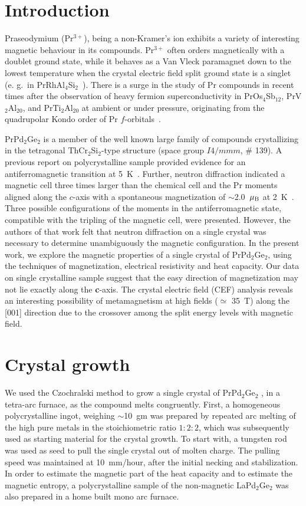 \documentclass[preprint,showpacs,preprintnumbers,amsmath,amssymb, prb]{revtex4}
\begin{document}
\section{Introduction}
Praseodymium (Pr$^{3+}$), being a non-Kramer's ion exhibits a variety of interesting magnetic behaviour in its compounds. Pr$^{3+}$ often orders magnetically with a doublet ground state, while it behaves as a Van Vleck paramagnet down to the lowest temperature when the crystal electric field split ground state is a singlet (e. g.~in PrRhAl$_4$Si$_2$~\cite{PrRhAl4Si2}). There is a surge in the study of Pr compounds in recent times after the observation of heavy fermion superconductivity in PrOs$_4$Sb$_{12}$, PrV$_2$Al$_{20}$, and  PrTi$_2$Al$_{20}$ at ambient or under pressure, originating from the quadrupolar Kondo order of Pr $f$\--orbitals~\cite{Bauer_PrOsSb, Sakai}.

PrPd$_2$Ge$_2$ is a member of the well known large family of compounds crystallizing in the tetragonal ThCr$_2$Si$_2$\--type structure (space group $I4/mmm$, \# 139). A previous report on polycrystalline sample provided evidence for an antiferromagnetic transition at 5~K~\cite{Welter}. Further, neutron diffraction indicated a magnetic cell three times larger than the chemical cell and the Pr moments aligned along the $c$\--axis with a  spontaneous magnetization of $\sim$2.0~$\mu_{\rm B}$ at 2~K~\cite{Welter}. Three possible configurations of the moments in the antiferromagnetic state, compatible with the tripling of the magnetic cell, were presented. However, the authors of that work felt that neutron diffraction on a single crystal was necessary to determine unambiguously the magnetic configuration. In the present work, we explore the magnetic properties of a single crystal of PrPd$_2$Ge$_2$, using the techniques of magnetization, electrical resistivity and heat capacity. Our data on single crystalline sample suggest that the easy direction of magnetization  may not lie exactly along the \textbf{c}-axis. The crystal electric field (CEF) analysis reveals an interesting possibility of metamagnetism at high fields ($\simeq$ 35~T) along the [001] direction due to the crossover among the  split energy levels with magnetic field. 

%
\section{Crystal growth}
%
We used the Czochralski  method to grow a single crystal of PrPd$_2$Ge$_2$ , in  a tetra-arc furnace, as the compound melts congruently. First, a homogeneous polycrystalline ingot, weighing  $\sim$10~gm was prepared by repeated arc melting of the  high pure metals in the stoichiometric ratio $1:2:2$, which was subsequently used as starting material for the crystal growth.  To start with, a tungsten rod was used as seed to pull the single crystal out of molten charge.  The pulling speed was maintained at 10~mm/hour, after the initial necking and stabilization. In order to estimate the magnetic part of the heat capacity and to estimate the magnetic entropy, a polycrystalline sample of the non-magnetic  LaPd$_2$Ge$_2$ was also prepared in a home built mono arc furnace.
\end{document}
